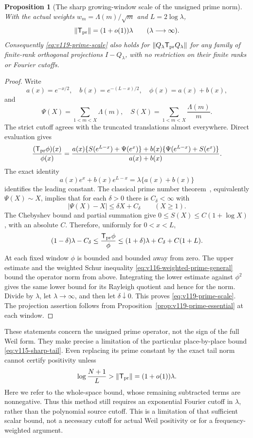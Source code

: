 \documentclass[11pt]{article}
\newtheorem{proposition}[theorem]{Proposition}
\theoremstyle{remark}
\begin{document}
\begin{proposition}[The sharp growing-window scale of the unsigned prime norm]
\label{prop:v119-prime-scale}
With the actual weights $w_m=\Lambda(m)/\sqrt m$ and $L=2\log\lambda$,
\begin{equation}\label{eq:v119-prime-scale}
 \|\mathsf T_{\rm pr}\|=(1+o(1))\lambda
       \qquad(\lambda\longrightarrow\infty).
\end{equation}
Consequently \eqref{eq:v119-prime-scale} also holds for
$\|Q_\lambda\mathsf T_{\rm pr}Q_\lambda\|$ for any family of
finite-rank orthogonal projections $I-Q_\lambda$, with no restriction on their
finite ranks or Fourier cutoffs.
\end{proposition}
\begin{proof}
Write
\[
 a(x)=e^{-x/2},\quad b(x)=e^{-(L-x)/2},\quad\phi(x)=a(x)+b(x),
\]
and
\[
 \Psi(X)=\sum_{1<m<X}\Lambda(m),\quad
 S(X)=\sum_{1<m<X}\frac{\Lambda(m)}m.
\]
The strict cutoff agrees with the truncated translations almost
everywhere.  Direct evaluation gives
\begin{equation}\label{eq:v119-prime-weight-ratio}
 \frac{(\mathsf T_{\rm pr}\phi)(x)}{\phi(x)}
 =\frac{a(x)\{S(e^{L-x})+\Psi(e^x)\}
       +b(x)\{\Psi(e^{L-x})+S(e^x)\}}{a(x)+b(x)}.
\end{equation}
The exact identity
\[
 a(x)e^x+b(x)e^{L-x}=\lambda\{a(x)+b(x)\}
\]
identifies the leading constant.  The classical prime number
theorem~\cite{NISTPrimeAsymptotics}, equivalently $\Psi(X)\sim X$,
implies that for each $\delta>0$ there is $C_\delta<\infty$ with
\[
 |\Psi(X)-X|\le\delta X+C_\delta\qquad(X\ge1).
\]
The Chebyshev bound and partial summation give
$0\le S(X)\le C(1+\log X)$, with an absolute $C$.
Therefore, uniformly for $0<x<L$,
\[
 (1-\delta)\lambda-C_\delta
 \le\frac{\mathsf T_{\rm pr}\phi}{\phi}
 \le(1+\delta)\lambda+C_\delta+C(1+L).
\]
At each fixed window $\phi$ is bounded and bounded away from zero.
The upper estimate and the weighted Schur inequality
\eqref{eq:v116-weighted-prime-general} bound the operator norm from
above.  Integrating the lower estimate against $\phi^2$ gives the
same lower bound for its Rayleigh quotient and hence for the norm.
Divide by $\lambda$, let $\lambda\to\infty$, and then let
$\delta\downarrow0$. This proves \eqref{eq:v119-prime-scale}.
The projection assertion follows from
Proposition~\ref{prop:v119-prime-essential} at each window.
\end{proof}

These statements concern the unsigned prime operator, not the sign of
the full Weil form.  They make precise a limitation of the particular
place-by-place bound \eqref{eq:v115-sharp-tail}. Even replacing its
prime constant by the exact tail norm cannot certify positivity unless
\begin{equation}\label{eq:v119-unsigned-cutoff}
 \log\frac{N+1}{L}>\|\mathsf T_{\rm pr}\|
       =(1+o(1))\lambda.
\end{equation}
Here we refer to the whole-space bound, whose remaining subtracted
terms are nonnegative. Thus this method still requires an exponential
Fourier cutoff in $\lambda$, rather than the polynomial source cutoff.
This is a limitation of that sufficient scalar bound, not a necessary
cutoff for actual Weil positivity or for a frequency-weighted argument.
\end{document}
